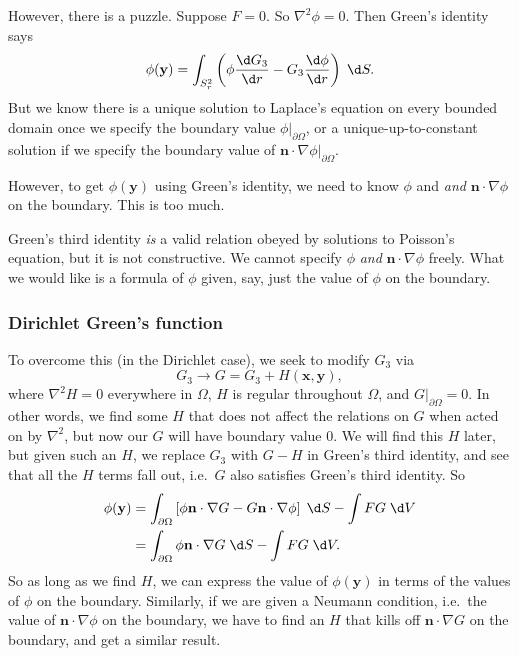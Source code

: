 \documentclass[a4paper]{article}
\begin{document}
However, there is a puzzle. Suppose $F = 0$. So $\nabla^2 \phi = 0$. Then Green's identity says
\[
  \phi(\mathbf{y}) = \int_{S_r^2} \left(\phi \frac{\d G_3}{\d r} - G_3 \frac{\d \phi}{\d r}\right)\;\d S.
\]
But we know there is a unique solution to Laplace's equation on every bounded domain once we specify the boundary value $\phi|_{\partial \Omega}$, or a unique-up-to-constant solution if we specify the boundary value of $\mathbf{n}\cdot \nabla \phi|_{\partial \Omega}$.

However, to get $\phi(\mathbf{y})$ using Green's identity, we need to know $\phi$ and \emph{and} $\mathbf{n} \cdot \nabla \phi$ on the boundary. This is too much.

Green's third identity \emph{is} a valid relation obeyed by solutions to Poisson's equation, but it is not constructive. We cannot specify $\phi$ \emph{and} $\mathbf{n}\cdot \nabla \phi$ freely. What we would like is a formula of $\phi$ given, say, just the value of $\phi$ on the boundary.

\subsubsection*{Dirichlet Green's function}
To overcome this (in the Dirichlet case), we seek to modify $G_3$ via
\[
  G_3 \to G = G_3 + H(\mathbf{x}, \mathbf{y}),
\]
where $\nabla^2 H = 0$ everywhere in $\Omega$, $H$ is regular throughout $\Omega$, and $G|_{\partial \Omega} = 0$. In other words, we find some $H$ that does not affect the relations on $G$ when acted on by $\nabla^2$, but now our $G$ will have boundary value $0$. We will find this $H$ later, but given such an $H$, we replace $G_3$ with $G - H$ in Green's third identity, and see that all the $H$ terms fall out, i.e.\ $G$ also satisfies Green's third identity. So
\begin{align*}
  \phi(\mathbf{y}) &= \int_{\partial\Omega} \left[\phi \mathbf{n}\cdot \nabla G - G \mathbf{n}\cdot \nabla \phi\right]\;\d S - \int FG\;\d V\\
  &= \int_{\partial\Omega} \phi \mathbf{n}\cdot \nabla G\;\d S - \int FG\;\d V.
\end{align*}
So as long as we find $H$, we can express the value of $\phi(\mathbf{y})$ in terms of the values of $\phi$ on the boundary. Similarly, if we are given a Neumann condition, i.e.\ the value of $\mathbf{n} \cdot \nabla \phi$ on the boundary, we have to find an $H$ that kills off $\mathbf{n}\cdot \nabla G$ on the boundary, and get a similar result.
\end{document}
